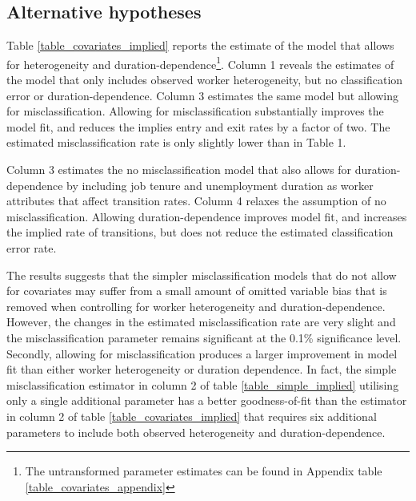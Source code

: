 \documentclass[letterpaper,12pt,final,dvipsnames]{article}
\begin{document}



\subsection{Alternative hypotheses}

Table \ref{table_covariates_implied} reports the estimate of the model that allows for heterogeneity and duration-dependence\footnote{The untransformed parameter estimates can be found in Appendix table \ref{table_covariates_appendix}}. Column 1 reveals the estimates of the model that only includes observed worker heterogeneity, but no classification error or duration-dependence. Column 3 estimates the same model but allowing for misclassification. Allowing for misclassification substantially improves the model fit, and reduces the implies entry and exit rates by a factor of two. The estimated misclassification rate is only slightly lower than in Table 1. 

Column 3 estimates the no misclassification model that also allows for duration-dependence by including job tenure and unemployment duration as worker attributes that affect transition rates. Column 4 relaxes the assumption of no misclassification. Allowing duration-dependence improves model fit, and increases the implied rate of transitions, but does not reduce the estimated classification error rate. 

The results suggests that the simpler misclassification models that do not allow for covariates may suffer from a small amount of omitted variable bias that is removed when controlling for worker heterogeneity and duration-dependence. However, the changes in the estimated misclassification rate are very slight and the misclassification parameter remains significant at the 0.1\% significance level. Secondly, allowing for misclassification produces a larger improvement in model fit than either worker heterogeneity or duration dependence. In fact, the simple misclassification estimator in column 2 of table \ref{table_simple_implied} utilising only a single additional parameter has a better goodness-of-fit than the estimator in column 2 of table \ref{table_covariates_implied} that requires six additional parameters to include both observed heterogeneity and duration-dependence. 
\end{document}

